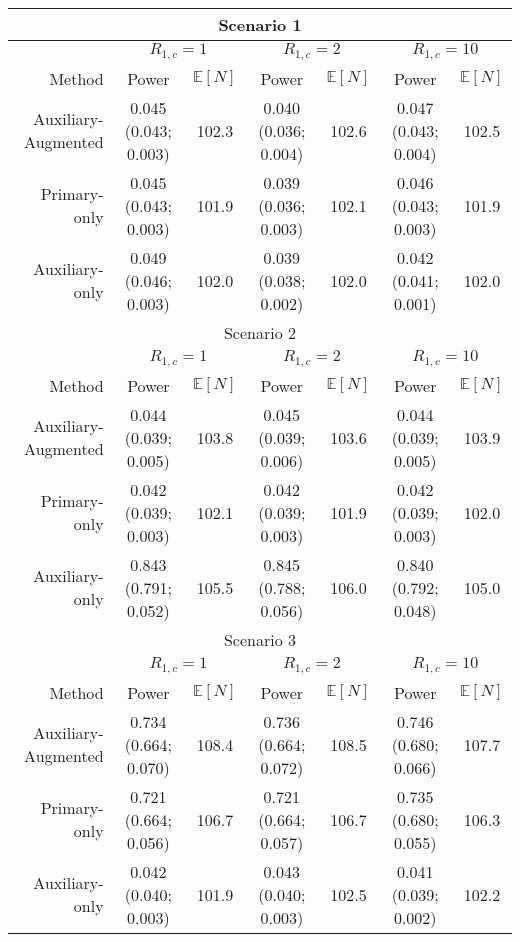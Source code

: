 \begin{tabular}{r|cc|cc|cc} 
\toprule 
\multicolumn{7}{c}{Scenario 1}\\ 
\midrule 
& \multicolumn{2}{c}{$R_{1,c}= 1$} & \multicolumn{2}{c}{$R_{1,c} = 2$} & \multicolumn{2}{c}{$R_{1,c} = 10$} \\ 
Method &  Power &   $\mathbb E[N]$ &
               Power &   $\mathbb E[N]$ &
               Power &   $\mathbb E[N]$  \\ 
Auxiliary-Augmented &0.045  (0.043; 0.003) & 102.3 &0.040  (0.036; 0.004) & 102.6 &0.047  (0.043; 0.004) & 102.5 \\ 
Primary-only &0.045  (0.043; 0.003) & 101.9 &0.039  (0.036; 0.003) & 102.1 &0.046  (0.043; 0.003) & 101.9 \\ 
Auxiliary-only &0.049  (0.046; 0.003) & 102.0 &0.039  (0.038; 0.002) & 102.0 &0.042  (0.041; 0.001) & 102.0 \\ 
\bottomrule 
\multicolumn{7}{c}{Scenario 2}\\ 
\midrule 
& \multicolumn{2}{c}{$R_{1,c}= 1$} & \multicolumn{2}{c}{$R_{1,c} = 2$} & \multicolumn{2}{c}{$R_{1,c} = 10$} \\ 
Method &  Power &   $\mathbb E[N]$ &
               Power &   $\mathbb E[N]$ &
               Power &   $\mathbb E[N]$  \\ 
Auxiliary-Augmented &0.044  (0.039; 0.005) & 103.8 &0.045  (0.039; 0.006) & 103.6 &0.044  (0.039; 0.005) & 103.9 \\ 
Primary-only &0.042  (0.039; 0.003) & 102.1 &0.042  (0.039; 0.003) & 101.9 &0.042  (0.039; 0.003) & 102.0 \\ 
Auxiliary-only &0.843  (0.791; 0.052) & 105.5 &0.845  (0.788; 0.056) & 106.0 &0.840  (0.792; 0.048) & 105.0 \\ 
\bottomrule 
\multicolumn{7}{c}{Scenario 3}\\ 
\midrule 
& \multicolumn{2}{c}{$R_{1,c}= 1$} & \multicolumn{2}{c}{$R_{1,c} = 2$} & \multicolumn{2}{c}{$R_{1,c} = 10$} \\ 
Method &  Power &   $\mathbb E[N]$ &
               Power &   $\mathbb E[N]$ &
               Power &   $\mathbb E[N]$  \\ 
Auxiliary-Augmented &0.734  (0.664; 0.070) & 108.4 &0.736  (0.664; 0.072) & 108.5 &0.746  (0.680; 0.066) & 107.7 \\ 
Primary-only &0.721  (0.664; 0.056) & 106.7 &0.721  (0.664; 0.057) & 106.7 &0.735  (0.680; 0.055) & 106.3 \\ 
Auxiliary-only &0.042  (0.040; 0.003) & 101.9 &0.043  (0.040; 0.003) & 102.5 &0.041  (0.039; 0.002) & 102.2 \\ 

\end{tabular}

